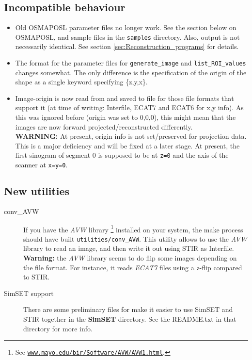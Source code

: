 \documentclass{article}
\def\R2Lurl#1#2{\mbox{\href{#1}{\tt #2}}}
\begin{document}
\subsection{Incompatible behaviour}
\begin{itemize}
\item Old OSMAPOSL parameter files no longer work. See the section below on OSMAPOSL,
   and sample files in the \texttt{samples} directory. Also, output is not necessarily
   identical. See section \ref{sec:Reconstruction_programs} for details.
\item The format for the parameter files for \texttt{generate\_image} and
   \texttt{list\_ROI\_values} changes somewhat. The only difference is the
   specification of the origin of the shape as a single keyword specifying \{z,y,x\}.
\item Image-origin is now read from and saved to file for those file formats that
    support it (at time of writing: Interfile, ECAT7 and ECAT6 for x,y info).
    As this was ignored before (origin was set to 0,0,0), this might mean that 
    the images are now forward projected/reconstructed differently.\\
    \textbf{WARNING:} At present, origin info is not set/preserved for
    projection data. This is a major deficiency and will be fixed at a later stage.
   At present, the first sinogram of segment 0 is supposed to be at \texttt{z=0} and
   the axis of the scanner at \texttt{x=y=0}.
\end{itemize}

\subsection{New utilities}
\begin{description}
\item[conv\_AVW]
If you have the \textit{AVW}\texttrademark{} library
\footnote{See \R2Lurl{http://www.mayo.edu/bir/Software/AVW/AVW1.html}{www.mayo.edu/bir/Software/AVW/AVW1.html}.
} installed on your system, the make process should have built \texttt{utilities/conv\_AVW}.
This utility allows to use the \textit{AVW} library to read an image, and then write it out
using STIR as Interfile.\\
\textbf{Warning:} the \textit{AVW} library seems to do flip some images depending
on the file format. For instance, it reads \textit{ECAT7} files using a z-flip compared
to STIR.
\item[SimSET support]
There are some preliminary files for make it easier to use SimSET and STIR together in the
\textbf{SimSET} directory. See the README.txt in that directory for more info.
\end{description}
\end{document}
